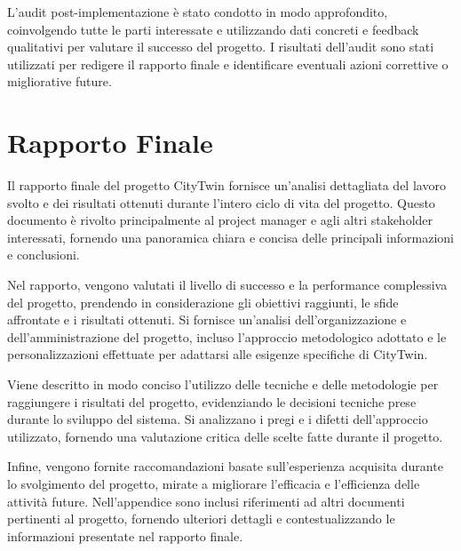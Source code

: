 L'audit post-implementazione è stato condotto in modo approfondito, coinvolgendo tutte le parti interessate e utilizzando dati concreti e feedback qualitativi per valutare il successo del progetto. I risultati dell'audit sono stati utilizzati per redigere il rapporto finale e identificare eventuali azioni correttive o migliorative future.

\section{Rapporto Finale}
Il rapporto finale del progetto CityTwin fornisce un'analisi dettagliata del lavoro svolto e dei risultati ottenuti durante l'intero ciclo di vita del progetto. Questo documento è rivolto principalmente al project manager e agli altri stakeholder interessati, fornendo una panoramica chiara e concisa delle principali informazioni e conclusioni.

Nel rapporto, vengono valutati il livello di successo e la performance complessiva del progetto, prendendo in considerazione gli obiettivi raggiunti, le sfide affrontate e i risultati ottenuti. Si fornisce un'analisi dell'organizzazione e dell'amministrazione del progetto, incluso l'approccio metodologico adottato e le personalizzazioni effettuate per adattarsi alle esigenze specifiche di CityTwin.

Viene descritto in modo conciso l'utilizzo delle tecniche e delle metodologie per raggiungere i risultati del progetto, evidenziando le decisioni tecniche prese durante lo sviluppo del sistema. Si analizzano i pregi e i difetti dell'approccio utilizzato, fornendo una valutazione critica delle scelte fatte durante il progetto.

Infine, vengono fornite raccomandazioni basate sull'esperienza acquisita durante lo svolgimento del progetto, mirate a migliorare l'efficacia e l'efficienza delle attività future. Nell'appendice sono inclusi riferimenti ad altri documenti pertinenti al progetto, fornendo ulteriori dettagli e contestualizzando le informazioni presentate nel rapporto finale.